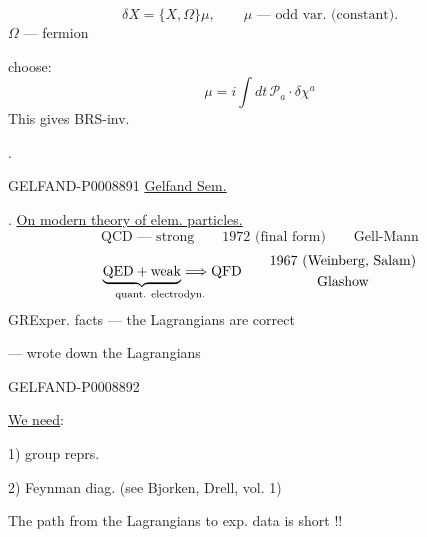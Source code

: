 \begin{equation*}
\delta X=\{X,\Omega\}\mu,\qquad
\mu\text{ --- odd var. (constant).}
\tag{12}
\end{equation*}
$\Omega$ --- fermion

choose:
\begin{equation*}
\mu=i\int dt\,\mathcal P_a\cdot\delta\chi^a
\tag{13}
\end{equation*}
This gives BRS-inv.

.


\begin{GelfandAdjacentEvidence}{GELFAND-P000889}{1}
\qquad \uline{Gelfand Sem.}

. \uline{On modern theory of elem. particles.}
\begin{equation*}
\mathrm{QCD}\text{ --- strong}\qquad
1972\text{ (final form)}\qquad\text{Gell-Mann}
\end{equation*}
\begin{equation*}
\underset{\makebox[0pt][l]{\scriptsize quant. electrodyn.}\phantom{\text{weak}\ \mathrm{QED}}}
{\underbrace{\mathrm{QED}+\text{weak}}}
\Longrightarrow\mathrm{QFD}
\qquad
\begin{gathered}
1967\text{ (Weinberg, Salam)}\\
\text{Glashow}
\end{gathered}
\end{equation*}
$\mathrm{GR}$\qquad Exper. facts --- the Lagrangians are correct

 --- wrote down the Lagrangians
\end{GelfandAdjacentEvidence}
\begin{GelfandAdjacentEvidence}{GELFAND-P000889}{2}


\uline{We need}:

1) group reprs.

2) Feynman diag. (see Bjorken, Drell, vol. 1)

The path from the Lagrangians to exp. data is short !!
\end{GelfandAdjacentEvidence}
